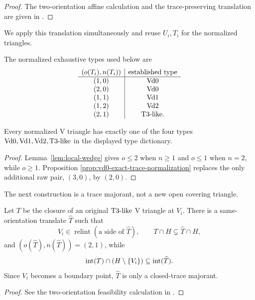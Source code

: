 \begin{proof}
The two-orientation affine calculation and the trace-preserving translation
are given in .
\end{proof}

We apply this translation simultaneously and reuse $U_i,T_i$ for the
normalized triangles.

The normalized exhaustive types used below are
\[
\begin{array}{c|c}
(o(T_i),n(T_i))&\text{established type}\\ \hline
(1,0)&\mathrm{Vd0}\\
(2,0)&\mathrm{Vd0}\\
(1,1)&\mathrm{Vd1}\\
(1,2)&\mathrm{Vd2}\\
(2,1)&\mathrm{T3\text{-}like}.
\end{array}
\]

\begin{proposition}
\label{prop:vertex-classification}
Every normalized V triangle has exactly one of the four types
$\mathrm{Vd0},\mathrm{Vd1},\mathrm{Vd2},\mathrm{T3\text{-}like}$ in the displayed type dictionary.
\end{proposition}

\begin{proof}
Lemma~\ref{lem:local-wedge} gives $o\le2$ when $n\ge1$ and $o\le1$ when
$n=2$, while $o\ge1$.  Proposition
\ref{prop:vd0-exact-trace-normalization} replaces the only additional raw
pair, $(3,0)$, by $(2,0)$.
\end{proof}

The next construction is a trace majorant, not a new open covering triangle.

\begin{proposition}
\label{prop:t3-translation}
Let $T$ be the closure of an original $\mathrm{T3\text{-}like}$ V triangle at $V_i$.  There is
a same-orientation translate $\widehat T$ such that
\[
 V_i\in\operatorname{relint}(\text{a side of }\widehat T),
 \qquad T\cap H\subsetneq\widehat T\cap H,
\]
and $(o(\widehat T),n(\widehat T))=(2,1)$, while
\[
 \mathrm{int}(T)\cap(H\setminus\{V_i\})\subseteq\mathrm{int}(\widehat T).
\]
Since $V_i$ becomes a boundary point, $\widehat T$ is only a closed-trace
majorant.
\end{proposition}

\begin{proof}
See the two-orientation feasibility calculation in
.
\end{proof}

